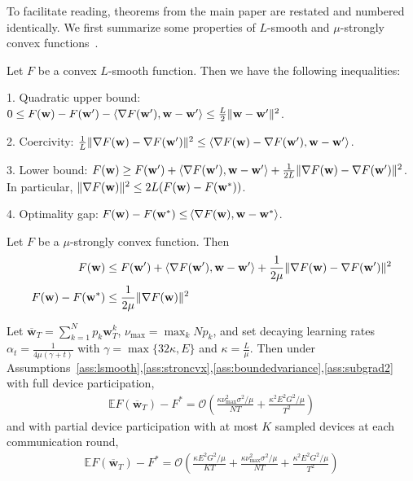 To facilitate reading, theorems from the main paper are restated and numbered identically. We first summarize some properties of $L$-smooth and $\mu$-strongly
convex functions~\cite{rockafellar1970convex}. 
\begin{lemma}
	Let $F$ be a convex $L$-smooth function. Then we have the following
	inequalities:
	
	1. Quadratic upper bound: $0\leq F({\mathbf{w}})-F({\mathbf{w}}')-\langle\nabla F({\mathbf{w}}'),{\mathbf{w}}-{\mathbf{w}}'\rangle\leq\frac{L}{2}\|{\mathbf{w}}-{\mathbf{w}}'\|^{2}$. 
	
	2. Coercivity: $\frac{1}{L}\|\nabla F({\mathbf{w}})-\nabla F({\mathbf{w}}')\|^{2}\leq\langle\nabla F({\mathbf{w}})-\nabla F({\mathbf{w}}'),{\mathbf{w}}-{\mathbf{w}}'\rangle$.
	
	3. Lower bound: $F({\mathbf{w}})\geq F({\mathbf{w}}')+\langle\nabla F({\mathbf{w}}'),{\mathbf{w}}-{\mathbf{w}}'\rangle+\frac{1}{2L}\|\nabla F({\mathbf{w}})-\nabla F({\mathbf{w}}')\|^{2}$.
	In particular, $\|\nabla F({\mathbf{w}})\|^{2}\leq2L(F({\mathbf{w}})-F({\mathbf{w}}^{\ast}))$.
	
	4. Optimality gap: $F({\mathbf{w}})-F({\mathbf{w}}^{\ast})\leq$$\langle\nabla F({\mathbf{w}}),{\mathbf{w}}-{\mathbf{w}}^{\ast}\rangle$.
\end{lemma}
%
\begin{lemma}
	Let $F$ be a $\mu$-strongly convex function. Then 
	\begin{align*}
	F({\mathbf{w}}) & \leq F({\mathbf{w}}')+\langle\nabla F({\mathbf{w}}'),{\mathbf{w}}-{\mathbf{w}}'\rangle+\frac{1}{2\mu}\|\nabla F({\mathbf{w}})-\nabla F({\mathbf{w}}')\|^{2}\\
	F({\mathbf{w}})-F({\mathbf{w}}^{\ast}) & \leq\frac{1}{2\mu}\|\nabla F({\mathbf{w}})\|^{2}
	\end{align*}
\end{lemma}

\begin{thm}
	Let $\overline{\mathbf{w}}_{T}=\sum_{k=1}^{N}p_{k}\mathbf{w}_{T}^{k}$,
	$\nu_{\max}=\max_{k}Np_{k}$, and set decaying learning rates $\alpha_{t}=\frac{1}{4\mu(\gamma+t)}$
	with $\gamma=\max\{32\kappa,E\}$ and $\kappa=\frac{L}{\mu}$. Then
	under Assumptions~\ref{ass:lsmooth},\ref{ass:stroncvx},\ref{ass:boundedvariance},\ref{ass:subgrad2} with full device participation, 
	\begin{align*}
	\mathbb{E}F(\overline{\mathbf{w}}_{T})-F^{\ast}=\mathcal{O}\left(\frac{\kappa\nu_{\max}^{2}\sigma^{2}/\mu}{NT}+\frac{\kappa^{2}E^{2}G^{2}/\mu}{T^{2}}\right)
	\end{align*}
	and with partial device participation with at most $K$ sampled devices
	at each communication round, 
	\begin{align*}
	\mathbb{E}F(\overline{\mathbf{w}}_{T})-F^{\ast}=\mathcal{O}\left(\frac{\kappa E^{2}G^{2}/\mu}{KT}+\frac{\kappa\nu_{\max}^{2}\sigma^{2}/\mu}{NT}+\frac{\kappa^{2}E^{2}G^{2}/\mu}{T^{2}}\right)
	\end{align*}
\end{thm}

